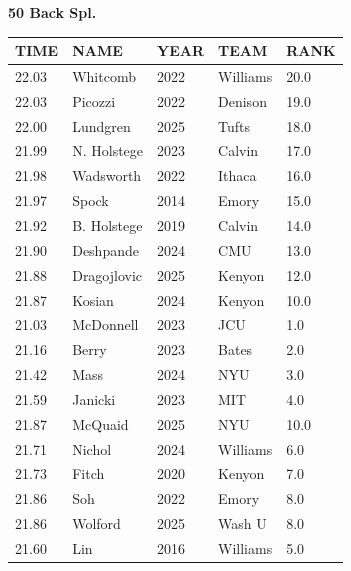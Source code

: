 \begin{table}[H]
\centering
\begin{minipage}[t]{0.6\textwidth}
\centering
\textbf{50 Back Spl.}\\[0.1cm]
\begin{tabular}{@{}p{1.8cm}p{2.8cm}p{1.2cm}p{1.4cm}p{0.8cm}@{}}
\hline
    \textbf{TIME} & \textbf{NAME} & \textbf{YEAR} & \textbf{TEAM} & \textbf{RANK} \\
\hline
    22.03 & Whitcomb & 2022 & Williams & 20.0 \\
    22.03 & Picozzi & 2022 & Denison & 19.0 \\
    22.00 & Lundgren & 2025 & Tufts & 18.0 \\
    21.99 & N. Holstege & 2023 & Calvin & 17.0 \\
    21.98 & Wadsworth & 2022 & Ithaca & 16.0 \\
    21.97 & Spock & 2014 & Emory & 15.0 \\
    21.92 & B. Holstege & 2019 & Calvin & 14.0 \\
    21.90 & Deshpande & 2024 & CMU & 13.0 \\
    21.88 & Dragojlovic & 2025 & Kenyon & 12.0 \\
    21.87 & Kosian & 2024 & Kenyon & 10.0 \\
    21.03 & McDonnell & 2023 & JCU & 1.0 \\
    21.16 & Berry & 2023 & Bates & 2.0 \\
    21.42 & Mass & 2024 & NYU & 3.0 \\
    21.59 & Janicki & 2023 & MIT & 4.0 \\
    21.87 & McQuaid & 2025 & NYU & 10.0 \\
    21.71 & Nichol & 2024 & Williams & 6.0 \\
    21.73 & Fitch & 2020 & Kenyon & 7.0 \\
    21.86 & Soh & 2022 & Emory & 8.0 \\
    21.86 & Wolford & 2025 & Wash U & 8.0 \\
    21.60 & Lin & 2016 & Williams & 5.0 \\
\hline
\end{tabular}
\end{minipage}
\end{table}

